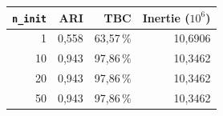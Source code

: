 \begin{tabular}{rrrr}
\toprule
\texttt{n\_init} & ARI & TBC & Inertie ($10^6$) \\
\midrule
1 & 0{,}558 & 63{,}57\,\% & 10{,}6906 \\
10 & 0{,}943 & 97{,}86\,\% & 10{,}3462 \\
20 & 0{,}943 & 97{,}86\,\% & 10{,}3462 \\
50 & 0{,}943 & 97{,}86\,\% & 10{,}3462 \\
\bottomrule
\end{tabular}

